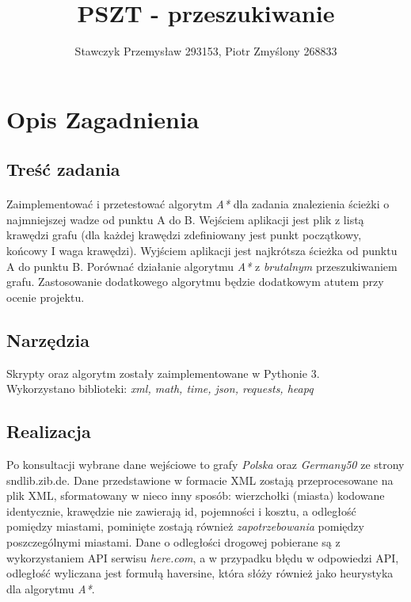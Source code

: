 \documentclass[11pt]{article} %
\title{PSZT - przeszukiwanie}
\author{Stawczyk Przemysław 293153, Piotr Zmyślony 268833}
\date{} %
\begin{document}
\maketitle

\section{Opis Zagadnienia}
\subsection{Treść zadania}
\paragraph{}
Zaimplementować i przetestować algorytm \textsl{A*} dla zadania znalezienia ścieżki o najmniejszej wadze od punktu A do B. Wejściem aplikacji jest plik z listą krawędzi grafu (dla każdej krawędzi zdefiniowany jest punkt początkowy, końcowy I waga krawędzi). Wyjściem aplikacji jest najkrótsza ścieżka od punktu A do punktu B. Porównać działanie algorytmu \textsl{A*}  z \textsl{brutalnym} przeszukiwaniem grafu. Zastosowanie dodatkowego algorytmu będzie dodatkowym atutem przy ocenie projektu.
\subsection{Narzędzia}
Skrypty oraz algorytm zostały zaimplementowane w Pythonie 3. \\
Wykorzystano biblioteki: \textsl{xml, math, time, json, requests, heapq }
\subsection{Realizacja}
Po konsultacji wybrane dane wejściowe to grafy  \textsl{Polska} oraz  \textsl{Germany50} ze strony sndlib.zib.de. Dane przedstawione w formacie XML zostają przeprocesowane na plik XML, sformatowany w nieco inny sposób: wierzchołki (miasta) kodowane identycznie, krawędzie nie zawierają id, pojemności i kosztu, a odległość pomiędzy miastami, pominięte zostają również  \textsl{zapotrzebowania} pomiędzy poszczególnymi miastami. 
Dane o odległości drogowej pobierane są z wykorzystaniem API serwisu \textsl{here.com}, a w przypadku błędu w odpowiedzi API, odległość wyliczana jest formułą haversine, która słóży również jako heurystyka dla algorytmu \textsl{A*}.
\end{document}
